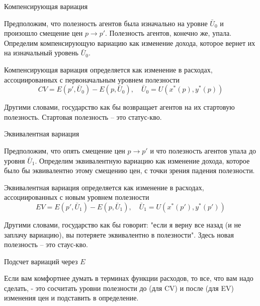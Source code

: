 \documentclass{beamer}
\begin{document}
\begin{frame}{Компенсирующая вариация}

Предположим, что полезность агентов была изначально на уровне $\bar U_0$ и произошло смещение цен $p \to p'$. Полезность агентов, конечно же, упала. Определим компенсирующую вариацию как изменение дохода, которое вернет их на изначальный уровень $\bar U_0$.

\begin{definition} Компенсирующая вариация определяется как изменение в расходах, ассоциированных с первоначальным уровнем полезности
$$CV = E(p',\bar U_0) - E(p,\bar U_0), \quad \bar U_0 = U(x^{\ast}(p), y^{\ast}(p))$$

\end{definition}

Другими словами, государство как бы возвращает агентов на их стартовую полезность. Стартовая полезность – это статус-кво.

\end{frame}

\begin{frame}{Эквивалентная вариация}

Предположим, что опять смещение цен $p \to p'$ и что полезность агентов упала до уровня $\bar U_1$. Определим эквивалентную вариацию как изменение дохода, которое было бы эквивалентно этому смещению цен, с точки зрения падения полезности.

\begin{definition}

Эквивалентная вариация определяется как изменение в расходах, ассоциированных с новым уровнем полезности
$$EV = E(p',\bar U_1) - E(p,\bar U_1), \quad \bar U_1 = U(x^{\ast}(p'), y^{\ast}(p'))$$
\end{definition}

Другими словами, государство как бы говорит: "если я верну все назад (и не заплачу вариацию), вы потеряете эквивалентно в полезности". Здесь новая полезность – это стаус-кво.

\end{frame}

\begin{frame}{Подсчет вариаций через $E$}

Если вам комфортнее думать в терминах функции расходов, то все, что вам надо сделать, - это сосчитать уровни полезности до (для CV) и после (для EV) изменения цен и подставить в определение.

\end{frame}
\end{document}
